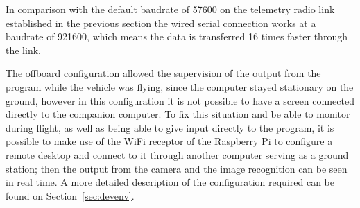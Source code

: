 In comparison with the default baudrate of 57600 on the telemetry radio link established in the previous section the wired serial connection works at a baudrate of 921600, which means the data is transferred 16 times faster through the link.

The offboard configuration allowed the supervision of the output from the program while the vehicle was flying, since the computer stayed stationary on the ground, however in this configuration it is not possible to have a screen connected directly to the companion computer.
To fix this situation and be able to monitor during flight, as well as being able to give input directly to the program, it is possible to make use of the WiFi receptor of the Raspberry Pi to configure a remote desktop and connect to it through another computer serving as a ground station;
then the output from the camera and the image recognition can be seen in real time.
A more detailed description of the configuration required can be found on Section~\ref{sec:devenv}.